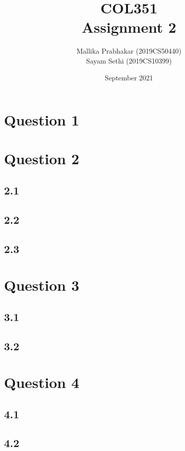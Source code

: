 \documentclass[11pt]{article}
\title{COL351\\Assignment 2}
\author{Mallika Prabhakar (2019CS50440)\\Sayam Sethi (2019CS10399)}
\date{September 2021}
\begin{document}
\maketitle

\tableofcontents


\section{Question 1}



\section{Question 2}

\subsection{2.1}


\subsection{2.2}


\subsection{2.3}



\section{Question 3}

\subsection{3.1}


\subsection{3.2}



\section{Question 4}

\subsection{4.1}


\subsection{4.2}

\end{document}
